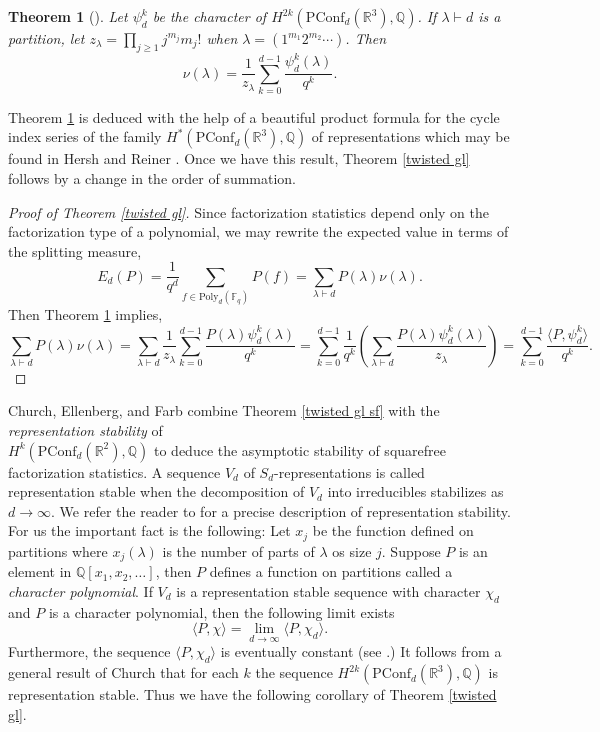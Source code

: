 \documentclass[submission]{FPSAC2018}
\newtheorem{thm}{Theorem}[section]
\theoremstyle{definition}
\numberwithin{equation}{section}
\def\QQ{\mathbb{Q}}
\def\FF{\mathbb{F}}
\def\RR{\mathbb{R}}
\newcommand\PConf{\mathrm{PConf}}
\newcommand{\poly}{\mathrm{Poly}}
\begin{document}
\begin{thm}[{\cite[Thm. 1.4]{Hyde1}}]
\label{thm split}
Let $\psi_d^k$ be the character of $H^{2k}(\PConf_d(\RR^3),\QQ)$. If $\lambda \vdash d$ is a partition, let $z_\lambda = \prod_{j\geq 1} j^{m_j} m_j!$ when $\lambda = (1^{m_1}2^{m_2}\cdots)$. Then
\[
    \nu(\lambda) = \frac{1}{z_\lambda}\sum_{k=0}^{d-1}\frac{\psi_d^k(\lambda)}{q^k}.
\]
\end{thm}
Theorem \ref{thm split} is deduced with the help of a beautiful product formula for the cycle index series of the family $H^{\ast}(\PConf_d(\RR^3),\QQ)$ of representations which may be found in Hersh and Reiner \cite[Thm. 2.7]{HershReiner}. Once we have this result, Theorem \ref{twisted gl} follows by a change in the order of summation.

\begin{proof}[Proof of Theorem \ref{twisted gl}]
Since factorization statistics depend only on the factorization type of a polynomial, we may rewrite the expected value in terms of the splitting measure,
\[
    E_d(P) = \frac{1}{q^d}\sum_{f\in \poly_d(\FF_q)} P(f) = \sum_{\lambda \vdash d} P(\lambda)\nu(\lambda).
\]
Then Theorem \ref{thm split} implies,
\[
    \sum_{\lambda \vdash d} P(\lambda)\nu(\lambda)
    = \sum_{\lambda\vdash d}\frac{1}{z_\lambda}\sum_{k=0}^{d-1} \frac{P(\lambda)\psi_d^k(\lambda)}{q^k}
    = \sum_{k=0}^{d-1} \frac{1}{q^k}\left(\sum_{\lambda \vdash d} \frac{P(\lambda)\psi_d^k(\lambda)}{z_\lambda}\right)
    = \sum_{k=0}^{d-1} \frac{\langle P, \psi_d^k\rangle}{q^k}.
\]
\end{proof}

Church, Ellenberg, and Farb combine Theorem \ref{twisted gl sf} with the \emph{representation stability} of\\ $H^k(\PConf_d(\RR^2),\QQ)$ to deduce the asymptotic stability of squarefree factorization statistics. A sequence $V_d$ of $S_d$-representations is called representation stable when the decomposition of $V_d$ into irreducibles stabilizes as $d\rightarrow\infty$. We refer the reader to \cite{ChurchFarb} for a precise description of representation stability. For us the important fact is the following: Let $x_j$ be the function defined on partitions where $x_j(\lambda)$ is the number of parts of $\lambda$ os size $j$. Suppose $P$ is an element in $\QQ[x_1, x_2,\ldots]$, then $P$ defines a function on partitions called a \emph{character polynomial}. If $V_d$ is a representation stable sequence with character $\chi_d$ and $P$ is a character polynomial, then the following limit exists
\[
    \langle P, \chi\rangle = \lim_{d\rightarrow\infty}\langle P, \chi_d\rangle.
\]
Furthermore, the sequence $\langle P, \chi_d\rangle$ is eventually constant (see \cite[Sec. 3.4]{CEF}.) It follows from a general result of Church \cite[Thm. 1]{Church} that for each $k$ the sequence $H^{2k}(\PConf_d(\RR^3),\QQ)$ is representation stable. Thus we have the following corollary of Theorem \ref{twisted gl}.
\end{document}
